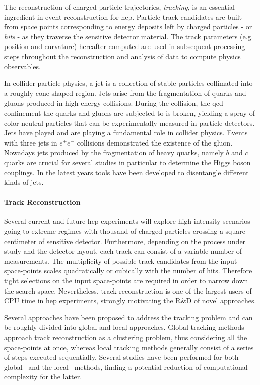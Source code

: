 The reconstruction of charged particle trajectories, \textit{tracking}, is an essential ingredient in event reconstruction for \gls{hep}. Particle track candidates are built from space points corresponding to energy deposits left by charged particles - or \textit{hits} - as they traverse the sensitive detector material. The track parameters (e.g. position and curvature) hereafter computed are used in subsequent processing steps throughout the reconstruction and analysis of data to compute physics observables.

In collider particle physics, a jet is a collection of stable particles collimated into a
roughly cone-shaped region. Jets arise from the fragmentation of quarks and gluons
produced in high-energy collisions. During the collision, the \gls{qcd} confinement the
quarks and gluons are subjected to is broken, yielding a spray of color-neutral
particles that can be experimentally measured in particle detectors. Jets have played
and are playing a fundamental role in collider physics. Events with three jets in $e^+ e^-$
collisions demonstrated the existence of the gluon. Nowadays jets produced by the
fragmentation of heavy quarks, namely $b$ and $c$ quarks are crucial for several studies
in particular to determine the Higgs boson couplings. In the latest years tools have
been developed to disentangle different kinds of jets.

\paragraph{Track Reconstruction}
Several current and future \gls{hep} experiments will explore high intensity scenarios going to extreme regimes with thousand of charged particles crossing a square centimeter of sensitive detector. Furthermore, depending on the process under study and the detector layout, each track can consist of a variable number of measurements. The multiplicity of possible track candidates from the input space-points scales quadratically or cubically with the number of hits. Therefore tight selections on the input space-points are required in order to narrow down the search space. Nevertheless, track reconstruction is one of the largest users of CPU time in \gls{hep} experiments, strongly motivating the R\&D of novel approaches.

Several approaches have been proposed to address the tracking problem and can be roughly divided into global and local approaches. Global tracking methods approach track reconstruction as a clustering problem, thus considering all the space-points at once, whereas local tracking methods generally consist of a series of steps executed sequentially. Several studies have been performed for both global~\cite{Funcke:2022dws,Crippa:2023ieq} and the local~\cite{Magano:2021jzd} methods, finding a potential reduction of computational complexity for the latter. 

